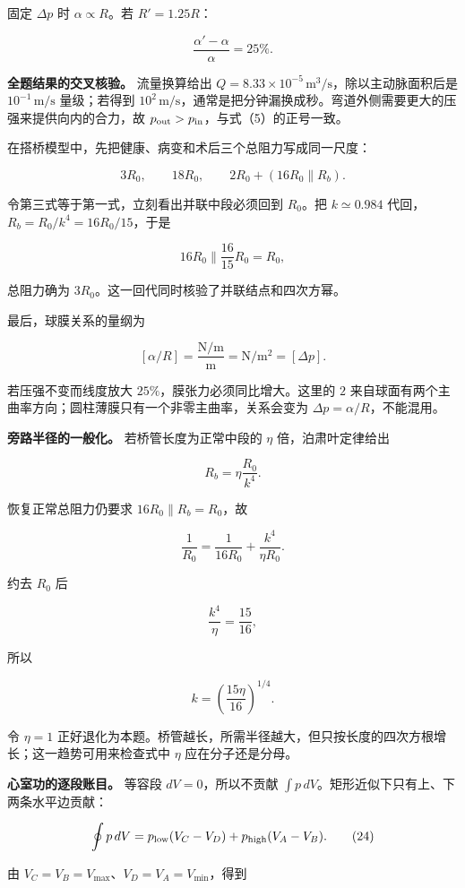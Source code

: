 \documentclass[12pt,a4paper,UTF8]{ctexart}
\begin{document}
固定 \(\Delta p\) 时 \(\alpha\propto R\)。若 \(R'=1.25R\)：

\[
\boxed{\frac{\alpha'-\alpha}{\alpha}=25\%}. \tag{20}
\]

\textbf{全题结果的交叉核验。} 流量换算给出
\(Q=8.33\times10^{-5}\,\mathrm{m^3/s}\)，除以主动脉面积后是
\(10^{-1}\,\mathrm{m/s}\) 量级；若得到
\(10^2\,\mathrm{m/s}\)，通常是把分钟漏换成秒。弯道外侧需要更大的压强来提供向内的合力，故
\(p_{\rm out}>p_{\rm in}\)，与式（5）的正号一致。

在搭桥模型中，先把健康、病变和术后三个总阻力写成同一尺度：

\[
3R_0,\qquad18R_0,\qquad
2R_0+(16R_0\parallel R_b). \tag{21}
\]

令第三式等于第一式，立刻看出并联中段必须回到 \(R_0\)。把
\(k\simeq0.984\) 代回，\(R_b=R_0/k^4=16R_0/15\)，于是

\[
16R_0\parallel\frac{16}{15}R_0=R_0,
\]

总阻力确为 \(3R_0\)。这一回代同时核验了并联结点和四次方幂。

最后，球膜关系的量纲为

\[
[\alpha/R]=\frac{\mathrm{N/m}}{\mathrm m}=\mathrm{N/m^2}=[\Delta p].
\]

若压强不变而线度放大 \(25\%\)，膜张力必须同比增大。这里的 \(2\)
来自球面有两个主曲率方向；圆柱薄膜只有一个非零主曲率，关系会变为
\(\Delta p=\alpha/R\)，不能混用。

\textbf{旁路半径的一般化。} 若桥管长度为正常中段的 \(\eta\)
倍，泊肃叶定律给出

\[
R_b=\eta\frac{R_0}{k^4}. \tag{22}
\]

恢复正常总阻力仍要求 \(16R_0\parallel R_b=R_0\)，故

\[
\frac1{R_0}=\frac1{16R_0}+\frac{k^4}{\eta R_0}.
\]

约去 \(R_0\) 后

\[
\frac{k^4}{\eta}=\frac{15}{16},
\]

所以

\[
\boxed{k=\left(\frac{15\eta}{16}\right)^{1/4}}. \tag{23}
\]

令 \(\eta=1\)
正好退化为本题。桥管越长，所需半径越大，但只按长度的四次方根增长；这一趋势可用来检查式中
\(\eta\) 应在分子还是分母。

\textbf{心室功的逐段账目。} 等容段 \(dV=0\)，所以不贡献
\(\int p\,dV\)。矩形近似下只有上、下两条水平边贡献：

\[
\oint p\,dV
=p_{\rm low}(V_C-V_D)
+p_{\rm high}(V_A-V_B). \tag{24}
\]

由 \(V_C=V_B=V_{\max}\)、\(V_D=V_A=V_{\min}\)，得到
\end{document}

